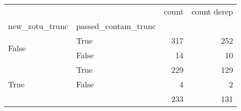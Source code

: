 \begin{tabular}{llrr}
\toprule
 &  & count & count derep \\
new_zotu_trunc & passed_contam_trunc &  &  \\
\midrule
\multirow[t]{2}{*}{False} & True & 317 & 252 \\
 & False & 14 & 10 \\
\cline{1-4}
\multirow[t]{3}{*}{True} & True & 229 & 129 \\
 & False & 4 & 2 \\
 &  & 233 & 131 \\
\cline{1-4}
\bottomrule
\end{tabular}
